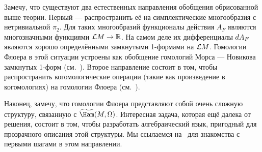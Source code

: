Замечу, что существуют два естественных направления обобщения
обрисованной выше теории. 
Первый — распространить её на симплектические многообразия с
нетривиальной $π_{2}$. 
Для таких многообразий функционалы действия $A_{F}$ являются
многозначными функциями $\mathcal{L} M\to\mathbb{R}$. На самом деле их дифференциалы
$d A_{F}$ являются хорошо определёнными замкнутыми 1-формами на
$\mathcal{L} M$.
Гомологии Флоера в этой ситуации устроены как обобщение гомологий
Морса — Новикова замкнутых 1-форм (см.~\cite{HS}).
Второе направление состоит в том, чтобы распространить
когомологические операции (такие как произведение в когомологиях) на
гомологии Флоера (см.~\cite{PSS}). 

Наконец, замечу, что гомологии Флоера
представляют собой очень сложную структуру, связанную с
$\widetilde\Ham(M,\Omega)$. 
Интересная задача, которая ещё далека от решения, состоит в том, чтобы
разработать алгебраический язык, пригодный для прозрачного описания
этой структуры. 
Мы ссылаемся на~\cite{Fu} для знакомства с первыми шагами в
этом направлении.  




